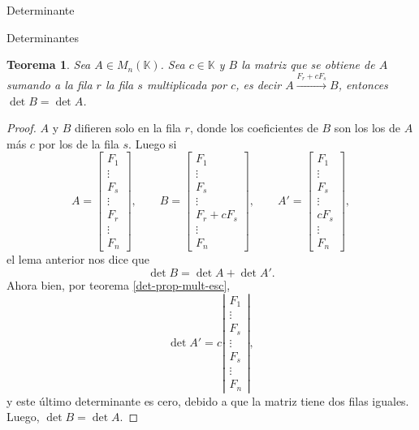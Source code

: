 \documentclass[a4paper,12pt,twoside,spanish]{amsbook}
\newtheorem{teorema}{Teorema}[section]
\theoremstyle{definition}
\theoremstyle{remark}
\newcommand{\K}{\mathbb K}
\begin{document}
\begin{chapter}{Determinante}
\begin{section}{Determinantes}
		\begin{teorema}\label{det-prop-fila-mas-cfila}
			Sea $A  \in M_n(\K)$. Sea $c \in \K$ y $B$ la matriz que se obtiene de $A$ sumando a la fila $r$ la fila $s$ multiplicada por $c$, es decir  $A  \stackrel{F_r + cF_s}{\longrightarrow} B$, entonces $\det B = \det A$.
		\end{teorema}
		\begin{proof}
			$A$ y $B$ difieren solo en la fila $r$, donde los coeficientes de $B$ son los los de $A$ más $c$ por los de la fila $s$. Luego si 
			\begin{equation*}
			A = \begin{bmatrix} F_1 \\ \vdots \\ F_s \\\vdots \\ F_r \\ \vdots \\ F_n \end{bmatrix}, \qquad 
			B = \begin{bmatrix} F_1 \\ \vdots \\ F_s \\\vdots \\ F_r + cF_s \\ \vdots \\ F_n \end{bmatrix},\qquad 
			A'= \begin{bmatrix} F_1 \\ \vdots \\ F_s \\\vdots \\ cF_s \\ \vdots \\ F_n \end{bmatrix},
			\end{equation*}
			el lema anterior nos dice que 
			\begin{equation}
			\det B = \det A + \det A'.
			\end{equation}
			Ahora bien, por teorema \ref{det-prop-mult-esc}, 
			$$
			\det A' = c \left| \begin{matrix} F_1 \\ \vdots \\ F_s \\\vdots \\ F_s \\ \vdots \\ F_n \end{matrix} \right|,
			$$
			y este último determinante es cero, debido a que la matriz tiene dos filas iguales. Luego,  $\det B = \det A$. 
		\end{proof}
		

\end{section}
\end{chapter}
\end{document}
